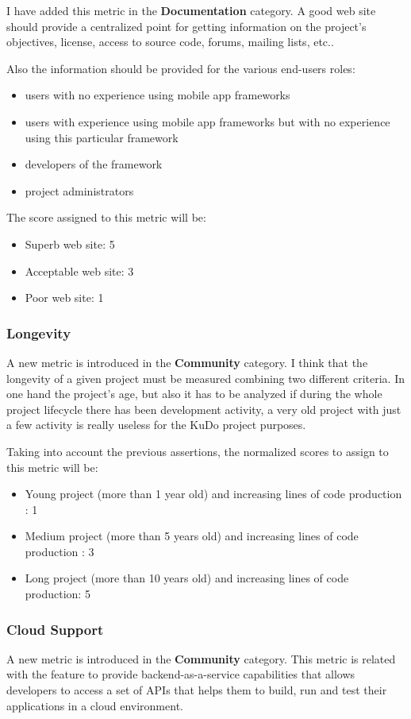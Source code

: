 \documentclass[a4paper,12pt]{book}
\begin{document}
I have added this metric in the \textbf{Documentation} category. A good web site should provide a centralized point for getting information on the project's objectives, license, access to source code, forums, mailing lists, etc..

Also the information should be provided for the various end-users roles: 
\begin{itemize}
 \item users with no experience using mobile app frameworks
 \item users with experience using mobile app frameworks but with no experience using this particular framework
 \item developers of the framework
 \item project administrators
\end{itemize}

The score assigned to this metric will be:
\begin{itemize}
 \item Superb web site: 5
 \item Acceptable web site: 3
 \item Poor web site: 1
\end{itemize}

\subsubsection{Longevity}
\label{Longevity}
A new metric is introduced in the \textbf{Community} category. I think that the longevity of a given project must be measured combining two different criteria. In one hand the project's age, but also it has to be analyzed if during the whole project lifecycle there has been development activity, a very old project with just a few activity is really useless for the KuDo project purposes.

Taking into account the previous assertions, the normalized scores to assign to this metric will be:
\begin{itemize}
 \item Young project (more than 1 year old) and increasing lines of code production : 1
  \item Medium project (more than 5 years old) and increasing lines of code production : 3
 \item Long project (more than 10 years old) and increasing lines of code production: 5
\end{itemize}

\subsubsection{Cloud Support}
\label{Cloud Support}
A new metric is introduced in the \textbf{Community} category. This metric is related with the feature to provide backend-as-a-service capabilities that allows developers to access a set of APIs that helps them to build, run and test their applications in a cloud environment.
\end{document}
